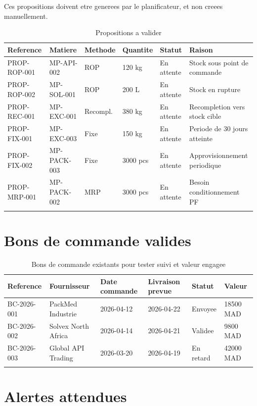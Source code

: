\documentclass[11pt,a4paper]{article}
\begin{document}
Ces propositions doivent etre generees par le planificateur, et non creees manuellement.

\begin{longtable}{|p{2.5cm}|p{2.6cm}|p{2cm}|p{2cm}|p{2.5cm}|p{3cm}|}
\hline
\textbf{Reference} & \textbf{Matiere} & \textbf{Methode} & \textbf{Quantite} & \textbf{Statut} & \textbf{Raison} \\
\hline
PROP-ROP-001 & MP-API-002 & ROP & 120 kg & En attente & Stock sous point de commande \\
\hline
PROP-ROP-002 & MP-SOL-001 & ROP & 200 L & En attente & Stock en rupture \\
\hline
PROP-REC-001 & MP-EXC-001 & Recompl. & 380 kg & En attente & Recompletion vers stock cible \\
\hline
PROP-FIX-001 & MP-EXC-003 & Fixe & 150 kg & En attente & Periode de 30 jours atteinte \\
\hline
PROP-FIX-002 & MP-PACK-003 & Fixe & 3000 pcs & En attente & Approvisionnement periodique \\
\hline
PROP-MRP-001 & MP-PACK-002 & MRP & 3000 pcs & En attente & Besoin conditionnement PF \\
\hline
\caption{Propositions a valider}
\end{longtable}

\section{Bons de commande valides}

\begin{longtable}{|p{2.6cm}|p{3.4cm}|p{2.4cm}|p{2.2cm}|p{2cm}|p{2cm}|}
\hline
\textbf{Reference} & \textbf{Fournisseur} & \textbf{Date commande} & \textbf{Livraison prevue} & \textbf{Statut} & \textbf{Valeur} \\
\hline
BC-2026-001 & PackMed Industrie & 2026-04-12 & 2026-04-22 & Envoyee & 18500 MAD \\
\hline
BC-2026-002 & Solvex North Africa & 2026-04-14 & 2026-04-21 & Validee & 9800 MAD \\
\hline
BC-2026-003 & Global API Trading & 2026-03-20 & 2026-04-19 & En retard & 42000 MAD \\
\hline
\caption{Bons de commande existants pour tester suivi et valeur engagee}
\end{longtable}

\section{Alertes attendues}
\end{document}
